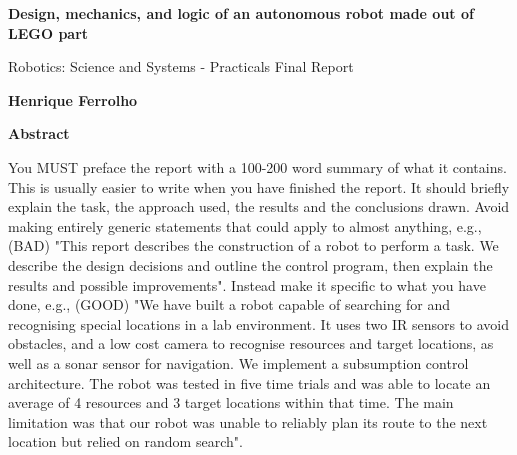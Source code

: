 \thispagestyle{plain}

\begin{center}
    \Large
    \textbf{Design, mechanics, and logic of an autonomous robot made out of LEGO part}
    
    \vspace{0.4cm}
    \large
    Robotics: Science and Systems - Practicals Final Report
    
    \vspace{0.4cm}
    \textbf{Henrique Ferrolho}
    
    \vspace{0.9cm}
    \textbf{Abstract}
\end{center}

You MUST preface the report with a 100-200 word summary of what it contains. This is usually easier to write when you have finished the report. It should briefly explain the task, the approach used, the results and the conclusions drawn. Avoid making entirely generic statements that could apply to almost anything, e.g., (BAD) "This report describes the construction of a robot to perform a task. We describe the design decisions and outline the control program, then explain the results and possible improvements". Instead make it specific to what you have done, e.g., (GOOD) "We have built a robot capable of searching for and recognising special locations in a lab environment. It uses two IR sensors to avoid obstacles, and a low cost camera to recognise resources and target locations, as well as a sonar sensor for navigation. We implement a subsumption control architecture. The robot was tested in five time trials and was able to locate an average of 4 resources and 3 target locations within that time. The main limitation was that our robot was unable to reliably plan its route to the next location but relied on random search".

\newpage
